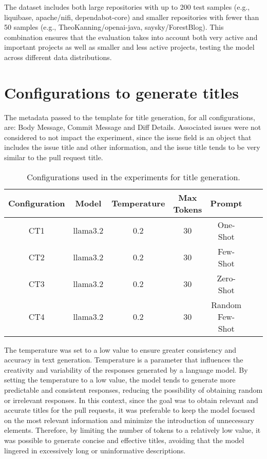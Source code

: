 The dataset includes both large repositories with up to 200 test samples (e.g., liquibase, apache/nifi, dependabot-core) and smaller repositories with fewer than 50 samples (e.g., TheoKanning/openai-java, saysky/ForestBlog). This combination ensures that the evaluation takes into account both very active and important projects as well as smaller and less active projects, testing the model across different data distributions.
\section{Configurations to generate titles}
The metadata passed to the template for title generation, for all configurations, are: Body Message, Commit Message and Diff Details.
Associated issues were not considered to not impact the experiment, since the issue field is an object that includes the issue title and other information, and the issue title tends to be very similar to the pull request title.
\begin{table}[H]
\centering
\begin{tabular}{|c|c|c|c|c|c|c|}
\hline
\textbf{Configuration} & \textbf{Model} & \textbf{Temperature} & \textbf{Max Tokens} & \textbf{Prompt}  \\ \hline
CT1 & llama3.2 & 0.2 & 30 & One-Shot \\ \hline
CT2 & llama3.2 & 0.2 & 30 & Few-Shot \\ \hline
CT3 & llama3.2 & 0.2 & 30 & Zero-Shot \\ \hline
CT4 & llama3.2 & 0.2 & 30 & Random Few-Shot \\ \hline
\end{tabular}
\caption{Configurations used in the experiments for title generation.}
\end{table}
The temperature was set to a low value to ensure greater consistency and accuracy in text generation. Temperature is a parameter that influences the creativity and variability of the responses generated by a language model. By setting the temperature to a low value, the model tends to generate more predictable and consistent responses, reducing the possibility of obtaining random or irrelevant responses. In this context, since the goal was to obtain relevant and accurate titles for the pull requests, it was preferable to keep the model focused on the most relevant information and minimize the introduction of unnecessary elements. Therefore, by limiting the number of tokens to a relatively low value, it was possible to generate concise and effective titles, avoiding that the model lingered in excessively long or uninformative descriptions.
